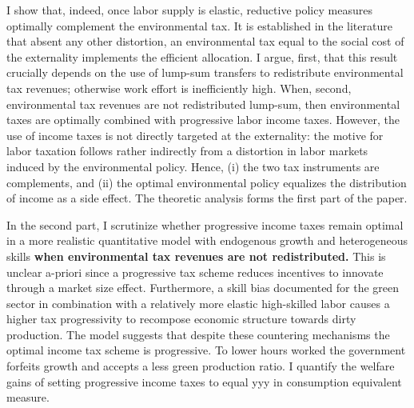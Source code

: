 I show that, indeed, once 
labor supply is elastic, reductive policy measures optimally complement the environmental tax. 
It is established in the literature that absent any other distortion, an environmental tax equal to the social cost of the externality implements the efficient allocation. I argue, first, that this result crucially depends on the use of lump-sum transfers to redistribute environmental tax revenues; otherwise work effort is inefficiently high.
 When, second, environmental tax revenues are not redistributed lump-sum, then  environmental taxes are optimally combined with progressive labor income taxes. However, the use of income taxes is not directly targeted at the externality: the motive for labor taxation follows rather indirectly from a distortion in labor markets induced by the environmental policy. Hence, (i) the two tax instruments are complements, and %
(ii) the optimal environmental policy equalizes the distribution of income as  a side effect. The theoretic analysis forms the first part of the paper.

In the second part, I scrutinize whether progressive income taxes remain optimal in a more realistic quantitative model with endogenous growth and heterogeneous skills \textbf{when environmental tax revenues are not redistributed. 
}This is unclear a-priori since a progressive tax scheme reduces incentives to innovate through a market size effect. Furthermore, a skill bias documented for the green sector \citep{Consoli2016DoCapital} in combination with a relatively more elastic high-skilled labor causes a higher tax progressivity to recompose economic structure towards dirty production. The model suggests that despite these countering mechanisms the optimal income tax scheme is progressive. To lower hours worked the government forfeits growth and accepts a less green production ratio.  I quantify the welfare gains of setting progressive income taxes to equal yyy in consumption equivalent measure.  


